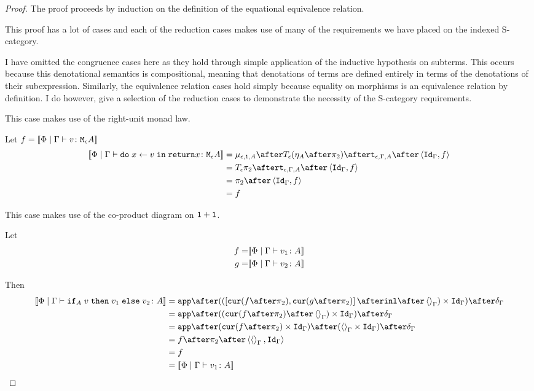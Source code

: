 \documentclass{Report}
\begin{document}
\begin{proof}
    The proof proceeds by induction on the definition of the equational equivalence relation.

    This proof has a lot of cases and each of the reduction cases makes use of many of the requirements we have placed on the indexed S-category.

    I have omitted the congruence cases here as they hold through simple application of the inductive hypothesis on subterms. This occurs because this denotational semantics is compositional, meaning that denotations of terms are defined entirely in terms of the denotations of their subexpression. Similarly, the equivalence relation cases hold simply because equality on morphisms is an equivalence relation by definition. I do however, give a selection of the reduction cases to demonstrate the necessity of the S-category requirements.

This case makes use of the right-unit monad law.

Let $f = {\bf [\![}\Phi\mid\Gamma \vdash v \colon \texttt{M}_{\epsilon}{A}{\bf ]\!]}$ 
    \begin{equation}
    \begin{split}
        \deno{\gpetyperelation{\doin{x}{v}{\return{x}}}{\mea}}  & = \bind{\e}{\1}{A} \after \T{\e}{(\point{A} \after \pp)} \after \tstrength{\e}{\G}{A}\after \pr{\idg}{f} \\
        & = \T{\e}{\pp} \after \tstrength{\e}{\G}{A} \after \pr {\idg}{f} \\
        & = \pp \after \pr{\idg}{f}\\
        & = f
    \end{split}
\end{equation}

This case makes use of the co-product diagram on $\texttt{1} + \texttt{1}$.

Let
\begin{align}
    f = &{\bf [\![}\Phi\mid\Gamma \vdash v_1 \colon A{\bf ]\!]}\\
    g = &{\bf [\![}\Phi\mid\Gamma \vdash v_2 \colon A{\bf ]\!]}\\
\end{align}

Then
\begin{equation}
    \begin{split}
        \deno{\gpetyperelation{\pifthenelse{A}{v}{v_1}{v_2}}{A}} & = \ifMorph{\inl\after\term{\G}}{f}{g} \\
        & = \app\after((\cur{f\after\pp}\after\term{\G})\times\idg)\after\diag{\G}\\
        & = \app\after(\cur{f\after\pp}\times\idg)\after(\term{\G}\times\idg)\after\diag{\G}\\
        & = f\after\pp\after\pr{\term{\G}}{\idg}\\
        & = f \\
        & = \deno{\gpetyperelation{v_1}{A}}\\
    \end{split}
\end{equation}


\end{proof}
\end{document}
